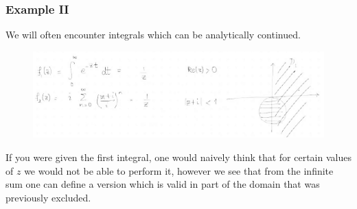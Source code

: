 \documentclass[a4paper,12pt]{article}
\begin{document}
\subsubsection{Example II}
We will often encounter integrals which can be analytically continued.
\begin{figure}[H]
	\centering
	\includegraphics[width=0.8\linewidth]{19}
	\caption{}
	\label{fig:4}
\end{figure}
If you were given the first integral, one would naively think that for certain values of $z$ we would not be able to perform it, however we see that from the infinite sum one can define a version which is valid in part of the domain that was previously excluded.\\\\
\end{document}
